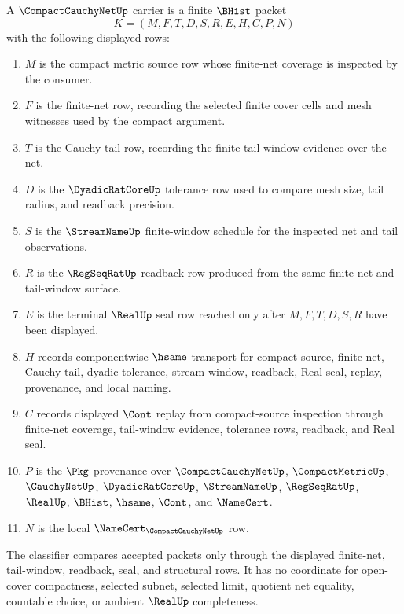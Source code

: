 \begin{definition}
\label{def:compact-cauchy-net-carrier}
A $\CompactCauchyNetUp$ carrier is a finite $\BHist$ packet
$$
K=(M,F,T,D,S,R,E,H,C,P,N)
$$
with the following displayed rows:
\begin{enumerate}
\item $M$ is the compact metric source row whose finite-net coverage is inspected by the consumer.
\item $F$ is the finite-net row, recording the selected finite cover cells and mesh witnesses used by the compact argument.
\item $T$ is the Cauchy-tail row, recording the finite tail-window evidence over the net.
\item $D$ is the $\DyadicRatCoreUp$ tolerance row used to compare mesh size, tail radius, and readback precision.
\item $S$ is the $\StreamNameUp$ finite-window schedule for the inspected net and tail observations.
\item $R$ is the $\RegSeqRatUp$ readback row produced from the same finite-net and tail-window surface.
\item $E$ is the terminal $\RealUp$ seal row reached only after $M,F,T,D,S,R$ have been displayed.
\item $H$ records componentwise $\hsame$ transport for compact source, finite net, Cauchy tail, dyadic tolerance, stream window, readback, Real seal, replay, provenance, and local naming.
\item $C$ records displayed $\Cont$ replay from compact-source inspection through finite-net coverage, tail-window evidence, tolerance rows, readback, and Real seal.
\item $P$ is the $\Pkg$ provenance over $\CompactCauchyNetUp$, $\CompactMetricUp$, $\CauchyNetUp$, $\DyadicRatCoreUp$, $\StreamNameUp$, $\RegSeqRatUp$, $\RealUp$, $\BHist$, $\hsame$, $\Cont$, and $\NameCert$.
\item $N$ is the local $\NameCert_{\CompactCauchyNetUp}$ row.
\end{enumerate}
The classifier compares accepted packets only through the displayed finite-net, tail-window, readback, seal, and structural rows. It has no coordinate for open-cover compactness, selected subnet, selected limit, quotient net equality, countable choice, or ambient $\RealUp$ completeness.
\end{definition}

